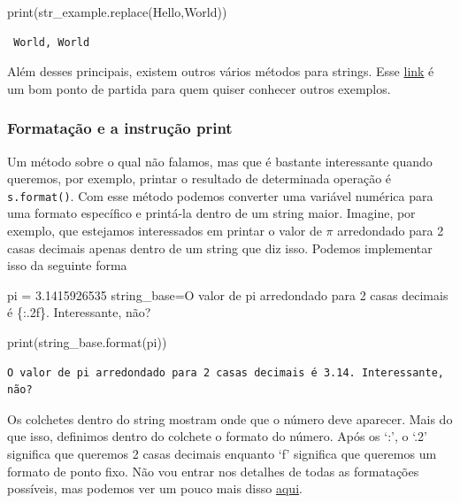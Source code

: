 \documentclass[
  brazilian,
  letterpaper,
  DIV=11,
  numbers=noendperiod]{scrreprt}
\newenvironment{Shaded}{\begin{snugshade}}{\end{snugshade}}
\newcommand{\BuiltInTok}[1]{\textcolor[rgb]{0.00,0.23,0.31}{#1}}
\newcommand{\FloatTok}[1]{\textcolor[rgb]{0.68,0.00,0.00}{#1}}
\newcommand{\NormalTok}[1]{\textcolor[rgb]{0.00,0.23,0.31}{#1}}
\newcommand{\OperatorTok}[1]{\textcolor[rgb]{0.37,0.37,0.37}{#1}}
\newcommand{\SpecialCharTok}[1]{\textcolor[rgb]{0.37,0.37,0.37}{#1}}
\newcommand{\StringTok}[1]{\textcolor[rgb]{0.13,0.47,0.30}{#1}}
\begin{document}
\begin{Shaded}
\begin{Highlighting}[]
\BuiltInTok{print}\NormalTok{(str\_example.replace(}\StringTok{\textquotesingle{}Hello\textquotesingle{}}\NormalTok{,}\StringTok{\textquotesingle{}World\textquotesingle{}}\NormalTok{))}
\end{Highlighting}
\end{Shaded}

\begin{verbatim}
 World, World
\end{verbatim}

Além desses principais, existem outros vários métodos para strings. Esse
\href{https://docs.python.org/pt-br/3/library/stdtypes.html\#textseq}{link}
é um bom ponto de partida para quem quiser conhecer outros exemplos.

\subsubsection{Formatação e a instrução
print}\label{formatauxe7uxe3o-e-a-instruuxe7uxe3o-print}

Um método sobre o qual não falamos, mas que é bastante interessante
quando queremos, por exemplo, printar o resultado de determinada
operação é \texttt{s.format()}. Com esse método podemos converter uma
variável numérica para uma formato específico e printá-la dentro de um
string maior. Imagine, por exemplo, que estejamos interessados em
printar o valor de \(\pi\) arredondado para 2 casas decimais apenas
dentro de um string que diz isso. Podemos implementar isso da seguinte
forma

\begin{Shaded}
\begin{Highlighting}[]
\NormalTok{pi }\OperatorTok{=} \FloatTok{3.1415926535}
\NormalTok{string\_base}\OperatorTok{=}\StringTok{\textquotesingle{}O valor de pi arredondado para 2 casas decimais é }\SpecialCharTok{\{:.2f\}}\StringTok{. Interessante, não?\textquotesingle{}}

\BuiltInTok{print}\NormalTok{(string\_base.}\BuiltInTok{format}\NormalTok{(pi))}
\end{Highlighting}
\end{Shaded}

\begin{verbatim}
O valor de pi arredondado para 2 casas decimais é 3.14. Interessante, não?
\end{verbatim}

Os colchetes dentro do string mostram onde que o número deve aparecer.
Mais do que isso, definimos dentro do colchete o formato do número. Após
os `:', o `.2' significa que queremos 2 casas decimais enquanto `f'
significa que queremos um formato de ponto fixo. Não vou entrar nos
detalhes de todas as formatações possíveis, mas podemos ver um pouco
mais disso
\href{https://www.w3schools.com/python/ref_string_format.asp}{aqui}.
\end{document}
